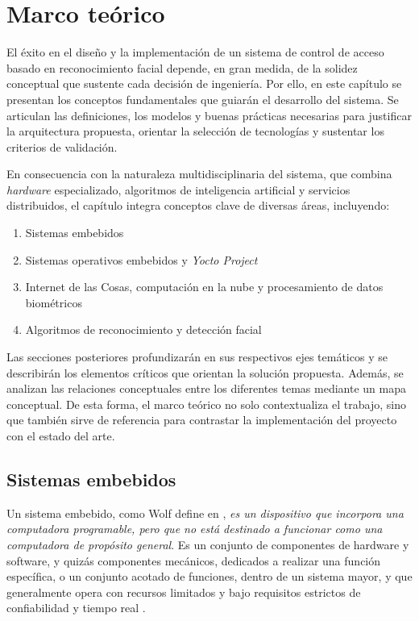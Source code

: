 \chapter{Marco teórico}
\label{ch:marco}

El éxito en el diseño y la implementación de un sistema de control de acceso basado en reconocimiento facial depende, en gran medida, de la solidez conceptual que sustente cada decisión de ingeniería. Por ello, en este capítulo se presentan los conceptos fundamentales que guiarán el desarrollo del sistema. Se articulan las definiciones, los modelos y buenas prácticas necesarias para justificar la arquitectura propuesta, orientar la selección de tecnologías y sustentar los criterios de validación.

En consecuencia con la naturaleza multidisciplinaria del sistema, que combina \textit{hardware} especializado, algoritmos de inteligencia artificial y servicios distribuidos, el capítulo integra conceptos clave de diversas áreas, incluyendo:

\begin{enumerate}
    \item Sistemas embebidos
    \item Sistemas operativos embebidos y \textit{Yocto Project}
    \item Internet de las Cosas, computación en la nube y procesamiento de datos biométricos
    \item Algoritmos de reconocimiento y detección facial
\end{enumerate}

Las secciones posteriores profundizarán en sus respectivos ejes temáticos y se describirán los elementos críticos que orientan la solución propuesta. Además, se analizan las relaciones conceptuales entre los diferentes temas mediante un mapa conceptual. De esta forma, el marco teórico no solo contextualiza el trabajo, sino que también sirve de referencia para contrastar la implementación del proyecto con el estado del arte.

\section{Sistemas embebidos}
Un sistema embebido, como Wolf define en \cite{wolf_embedded_2012}, \textit{es un dispositivo que incorpora una computadora programable, pero que no está destinado a funcionar como una computadora de propósito general}. Es un conjunto de componentes de hardware y software, y quizás componentes mecánicos, dedicados a realizar una función específica, o un conjunto acotado de funciones, dentro de un sistema mayor, y que generalmente opera con recursos limitados y bajo requisitos estrictos de confiabilidad y tiempo real \cite{barr_embedded_1999}.

